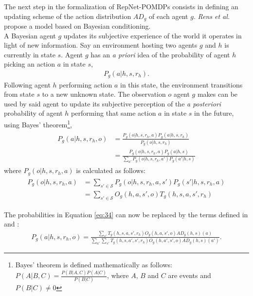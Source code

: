 The next step in the formalization of RepNet-POMDPs consists in defining an updating scheme of the action distribution $AD_g$ of each agent $g$. \textit{Rens et al.} \cite{rensetal} propose a model based on Bayesian conditioning.\\
A Bayesian agent $g$ updates its subjective experience of the world it operates in light of new information. Say an environment hosting two agents $g$ and $h$ is currently in state $s$. Agent $g$ has an \textit{a priori} idea of the probability of agent $h$ picking an action $a$ in state $s$,
\begin{align}
    P_g(a | h, s, r_h).
\end{align}
Following agent $h$ performing action $a$ in this state, the environment transitions from state $s$ to a new unknown state. The observation $o$ agent $g$ makes can be used by said agent to update its subjective perception of the \textit{a posteriori} probability of agent $h$ performing that same action $a$ in state $s$ in the future, using Bayes' theorem\footnote{Bayes' theorem is defined mathematically as follows: $P(A | B,C) = \frac{P(B|A,C) P(A|C)}{P(B|C)}$, where $A$, $B$ and $C$ are events and $P(B | C) \neq 0$},
\begin{align}
\label{eq:34}
\begin{split}
    P_g(a | h,s,r_h,o) &= \frac{P_g(o | h,s,r_h,a) P_g(a | h, s,r_h)}{P_g(o|h,s,r_h)} 
    \\
    &= \frac{P_g(o | h,s,r_h,a) P_g(a | h, s)}{\sum_{a'} P_g(o|h,s,r_h,a') P_g(a' | h,s)}
\end{split}
\end{align}
where $P_g(o | h,s,r_h,a)$ is calculated as follows:
\begin{align}
\begin{split}
    P_g(o | h,s,r_h,a) &= \sum_{s' \in \mathcal{S}} P_g(o | h,s,r_h,a,s') P_g(s' | h,s,r_h,a) \\&= \sum_{s' \in \mathcal{S}} O_g(h,a,s',o) T_g(h,s,a,s',r_h)
    \end{split}
\end{align}

The probabilities in Equation \ref{eq:34} can now be replaced by the terms defined in  and :
\begin{align}
    P_g(a | h,s,r_h,o) = \frac{\sum_{s'} T_g(h,s,a,s',r_h) O_g(h,a,s',o) AD_g(h,s)(a)}{\sum_{a'} \sum_{s'} T_g(h,s,a',s',r_h) O_g(h,a',s',o) AD_g(h,s)(a')}.
\end{align}

